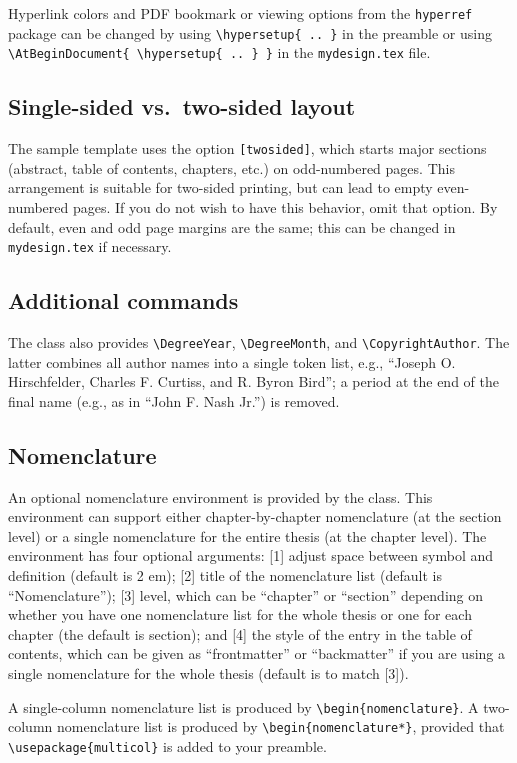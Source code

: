 \documentclass[11pt]{article}
\begin{document}
Hyperlink colors and PDF bookmark or viewing options from the \texttt{hyperref} package can be changed by using \verb|\hypersetup{ .. }| in the preamble or using \verb|\AtBeginDocument{ \hypersetup{ .. } }| in the \texttt{mydesign.tex} file.

\subsection{Single-sided vs.\ two-sided layout}
The sample template uses the option \texttt{[twosided]}, which starts major sections (abstract, table of contents, chapters, etc.) on odd-numbered pages.  This arrangement is suitable for two-sided printing, but can lead to empty even-numbered pages. If you do not wish to have this behavior, omit that option.  By default, even and odd page margins are the same; this can be changed in \texttt{mydesign.tex} if necessary.

\subsection{Additional commands}
The class also provides \verb|\DegreeYear|, \verb|\DegreeMonth|, and \verb|\CopyrightAuthor|. The latter combines all author names into a single token list, e.g., ``Joseph O. Hirschfelder, Charles F. Curtiss, and R. Byron Bird''; a period at the end of the final name (e.g., as in ``John F. Nash Jr.'') is removed.

\subsection{Nomenclature}
An optional nomenclature environment is provided by the class.  This environment can support either chapter-by-chapter nomenclature (at the section level) or a single nomenclature for the entire thesis (at the chapter level). The environment has four optional arguments: [1] adjust space between symbol and definition (default is 2 em); [2] title of the nomenclature list (default is ``Nomenclature''); [3] level, which can be ``chapter'' or ``section'' depending on whether you
have one nomenclature list for the whole thesis or one for each chapter (the default is section); and [4] the style of the entry in the table of contents, which can be given as ``frontmatter'' or ``backmatter'' if you are using a single nomenclature for the whole thesis (default is to match [3]).  

A single-column nomenclature list is produced by \verb|\begin{nomenclature}|. A two-column nomenclature list is produced by \verb|\begin{nomenclature*}|, provided that \verb|\usepackage{multicol}| is added to your preamble.
\end{document}
